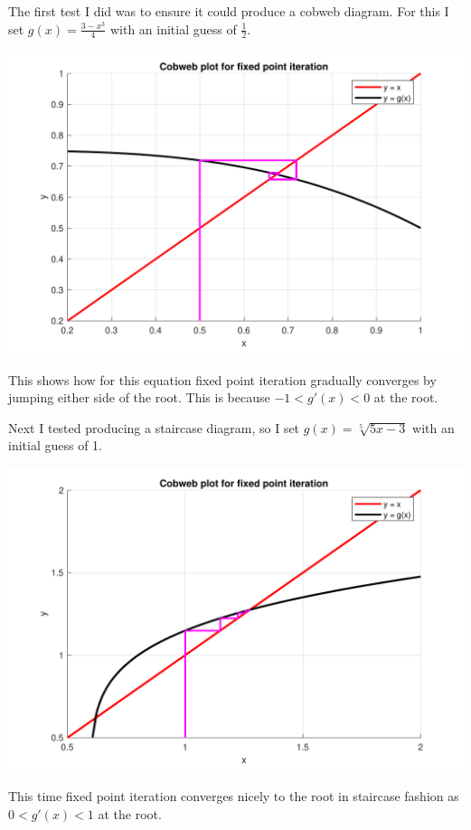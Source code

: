 \documentclass[a4paper,11pt]{article}
\begin{document}
\begin{enumerate}
	The first test I did was to ensure it could produce a cobweb diagram. For 
	this I set $g(x) = \frac{3 - x^{3}}{4}$ with an initial guess of 
	$\frac{1}{2}$.
	
	\begin{center}
		\includegraphics[scale=0.6]{images/Q1d_cobweb.pdf}
	\end{center}
	This shows how for this equation fixed point iteration gradually 
	converges by jumping either 
	side of the root. This is because $-1<g'(x)<0$ at the root.

	Next I tested producing a staircase diagram, so I set $g(x) = 
	\sqrt[5]{5x-3}$ with an initial guess of 1.
	
	\begin{center}
		\includegraphics[scale=0.6]{images/Q1d_staircase.pdf}
	\end{center}
	This time fixed point iteration converges nicely to the root in staircase 
	fashion as $0<g'(x)<1$ at the root.


\end{enumerate}
\end{document}
